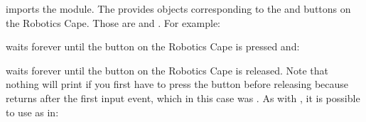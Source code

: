 \documentclass[letterpaper,10pt,english]{sphinxmanual}
\begin{document}
\begin{sphinxVerbatim}[commandchars=\\\{\}]
   
\end{sphinxVerbatim}

imports the module. The {\hyperref[\detokenize{index:rcpy-button}]{}} provides
objects corresponding to the  and  buttons on the
Robotics Cape. Those are {\hyperref[\detokenize{index:rcpy.button.pause}]{}} and
{\hyperref[\detokenize{index:rcpy.button.mode}]{}}. For example:

\begin{sphinxVerbatim}[commandchars=\\\{\}]
 
\end{sphinxVerbatim}

waits forever until the  button on the Robotics Cape is pressed and:

\begin{sphinxVerbatim}[commandchars=\\\{\}]
 
\end{sphinxVerbatim}

waits forever until the  button on the Robotics Cape is
released. Note that nothing will print if you first have to press the
button before releasing because {\hyperref[\detokenize{index:rcpy.button.Button.released}]{}}
returns  after the first input event, which in this case
was . As with {\hyperref[\detokenize{index:rcpy-gpio}]{}}, it is possible to use
{\hyperref[\detokenize{index:rcpy.gpio.InputTimeout}]{}} as in:
\end{document}
